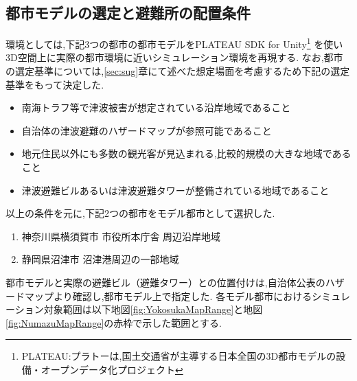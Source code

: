 \subsection{都市モデルの選定と避難所の配置条件}
環境としては,下記3つの都市の都市モデルをPLATEAU SDK for Unity\footnote{
  PLATEAU:プラトーは,国土交通省が主導する日本全国の3D都市モデルの設備・オープンデータ化プロジェクト
}
を使い3D空間上に実際の都市環境に近いシミュレーション環境を再現する.
なお,都市の選定基準については,\ref{sec:sug}章にて述べた想定場面を考慮するため下記の選定基準をもって決定した.
\begin{itemize}
  \item 南海トラフ等で津波被害が想定されている沿岸地域であること
  \item 自治体の津波避難のハザードマップが参照可能であること
  \item 地元住民以外にも多数の観光客が見込まれる,比較的規模の大きな地域であること
  \item 津波避難ビルあるいは津波避難タワーが整備されている地域であること
\end{itemize}
以上の条件を元に,下記2つの都市をモデル都市として選択した.
\begin{enumerate}
  \item 神奈川県横須賀市 市役所本庁舎 周辺沿岸地域
  \item 静岡県沼津市 沼津港周辺の一部地域
\end{enumerate}
都市モデルと実際の避難ビル（避難タワー）との位置付けは,自治体公表のハザードマップ\cite{yokosukaHazardMap}\cite{numazuHazardMap}より確認し,都市モデル上で指定した.
各モデル都市におけるシミュレーション対象範囲は以下地図\ref{fig:YokosukaMapRange}と地図\ref{fig:NumazuMapRange}の赤枠で示した範囲とする.
